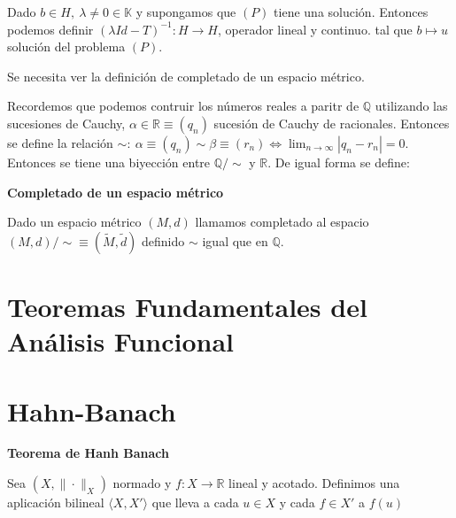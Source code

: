 \documentclass[openany]{book}
\begin{document}
\begin{corollary}
    Dado $ b \in H,\ \lambda \ne 0 \in \mathbb{K}$ y supongamos que $ (P)$ tiene una solución. Entonces podemos definir $ (\lambda Id-T) ^{-1}: H\to H$, operador lineal y continuo. tal que $ b \mapsto u$ solución del problema $ (P)$. 
    
\end{corollary}



Se necesita ver la definición de completado de un espacio métrico.

Recordemos que podemos contruir los números reales a paritr de $ \mathbb{Q}$ utilizando las sucesiones de Cauchy, $ \alpha \in \mathbb{R} \equiv (q_n)$ sucesión de Cauchy de racionales. Entonces se define la relación $ \sim:\ \alpha \equiv (q_n) \sim \beta \equiv (r_n) \iff \lim_{n \to \infty} |q_n-r_n| = 0$. Entonces se tiene una biyección entre $ \mathbb{Q}/\sim$ y $ \mathbb{R}$. De igual forma se define:

\begin{definition}
    \textbf{Completado de un espacio métrico}

    Dado un espacio métrico $ (M,d)$ llamamos completado al espacio $ (M,d)/\sim \equiv (\widetilde{M},\widetilde{d})$ definido $ \sim$ igual que en $ \mathbb{Q}$.
\end{definition}


\chapter{Teoremas Fundamentales del Análisis Funcional}

\chapter{Hahn-Banach}

\begin{theorem}
    \textbf{Teorema de Hanh Banach}

    Sea $ (X,\|\cdot \|_{X})$ normado y $ f: X \to \mathbb{R}$ lineal y acotado. Definimos una aplicación bilineal $ \langle X, X' \rangle $ que lleva a cada $ u \in X$ y cada $ f \in X'$ a $ f(u)$

\end{theorem}
\end{document}
